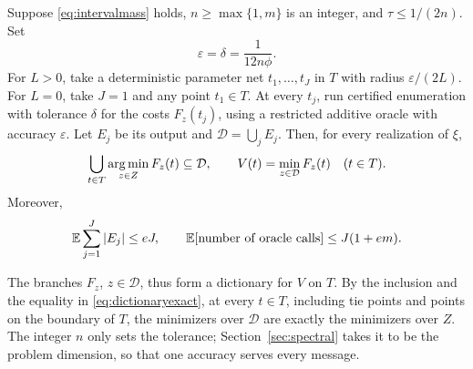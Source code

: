 \begin{theorem}
\label{thm:dictionary}
Suppose \eqref{eq:intervalmass} holds, $n\ge\max\{1,m\}$ is an integer,
and $\tau\le1/(2n)$. Set
\begin{equation}\label{eq:accuracy}
 \varepsilon=\delta=\frac1{12n\phi}.
\end{equation}
For $L>0$, take a deterministic parameter net $t_1,\ldots,t_J$ in $T$
with radius $\varepsilon/(2L)$. For $L=0$, take $J=1$ and any point
$t_1\in T$. At every $t_j$, run certified enumeration with tolerance
$\delta$ for the costs $F_z(t_j)$, using a restricted additive oracle
with accuracy $\varepsilon$. Let $E_j$ be its output and
$\mathcal D=\bigcup_j E_j$. Then, for every realization of $\xi$,
\begin{equation}\label{eq:dictionaryexact}
 \bigcup_{t\in T}\operatorname*{arg\,min}_{z\in Z}F_z(t)\subseteq\mathcal D,
 \qquad V(t)=\min_{z\in\mathcal D}F_z(t)\quad(t\in T).
\end{equation}
Moreover,
\begin{equation}\label{eq:dictionarysize}
 \mathbb E\sum_{j=1}^J|E_j|\le eJ,
 \qquad\mathbb E[\text{number of oracle calls}]\le J(1+em).
\end{equation}
\end{theorem}

The branches $F_z$, $z\in\mathcal D$, thus form a dictionary for $V$ on
$T$. By the inclusion and the equality in \eqref{eq:dictionaryexact}, at
every $t\in T$, including tie points and points on the boundary of $T$,
the minimizers over $\mathcal D$ are exactly the minimizers over $Z$.
The integer $n$ only sets the tolerance; Section~\ref{sec:spectral}
takes it to be the problem dimension, so that one accuracy serves every
message.

